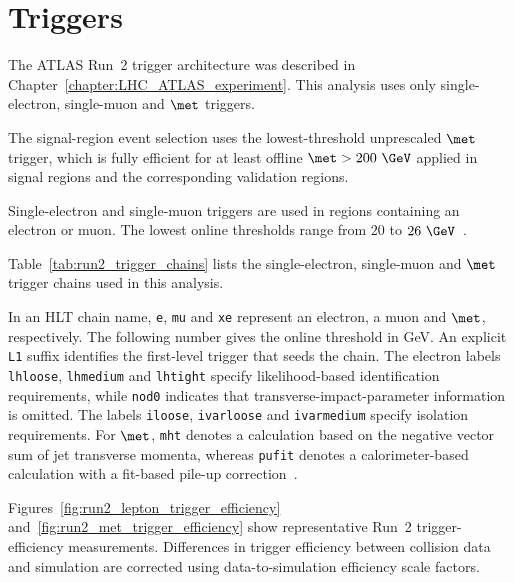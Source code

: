 \section{Triggers}
\label{sec:analysis_triggers}

The ATLAS Run~2 trigger architecture was described in Chapter~\ref{chapter:LHC_ATLAS_experiment}.
This analysis uses only single-electron, single-muon and $\met$ triggers.

The signal-region event selection uses the lowest-threshold unprescaled $\met$ trigger, which is fully efficient for at least offline $\met>200~\GeV$ applied in signal regions and the corresponding validation regions.

Single-electron and single-muon triggers are used in regions containing an electron or muon.
The lowest online thresholds range from $20$ to $26~\GeV$~\cite{ATLASElectronTriggerRun2,ATLASMuonTriggerRun2}.

Table~\ref{tab:run2_trigger_chains} lists the single-electron, single-muon and $\met$ trigger chains used in this analysis.

In an HLT chain name, \texttt{e}, \texttt{mu} and \texttt{xe} represent an electron, a muon and $\met$, respectively. The following number gives the online threshold in GeV.
An explicit \texttt{L1} suffix identifies the first-level trigger that seeds the chain.
The electron labels \texttt{lhloose}, \texttt{lhmedium} and \texttt{lhtight} specify likelihood-based identification requirements, while \texttt{nod0} indicates that transverse-impact-parameter information is omitted.
The labels \texttt{iloose}, \texttt{ivarloose} and \texttt{ivarmedium} specify isolation requirements.
For $\met$, \texttt{mht} denotes a calculation based on the negative vector sum of jet transverse momenta, whereas \texttt{pufit} denotes a calorimeter-based calculation with a fit-based pile-up correction~\cite{ATLASElectronTriggerRun2,ATLASMuonTriggerRun2,ATLASMETTriggerRun2}.

Figures~\ref{fig:run2_lepton_trigger_efficiency} and~\ref{fig:run2_met_trigger_efficiency} show representative Run~2 trigger-efficiency measurements.
Differences in trigger efficiency between collision data and simulation are corrected using data-to-simulation efficiency scale factors.


